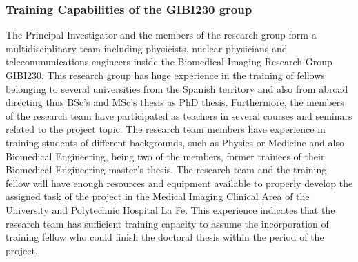 \subsubsection*{Training Capabilities of the GIBI230 group}
The Principal Investigator and the members of the research group form a multidisciplinary team including physicists, nuclear physicians and telecommunications engineers inside the Biomedical Imaging Research Group GIBI230. This research group has huge experience in the training of fellows belonging to several universities from the Spanish territory and also from abroad directing thus BSc’s and MSc’s thesis as PhD thesis. Furthermore, the members of the research team have participated as teachers in several courses and seminars related to the project topic. 
The research team members have experience in training students of different backgrounds, such as Physics or Medicine and also Biomedical Engineering, being two of the members, former trainees of their Biomedical Engineering master’s thesis.
The research team and the training fellow will have enough resources and equipment available to properly develop the assigned task of the project in the Medical Imaging Clinical Area of the University and Polytechnic Hospital La Fe. 
This experience indicates that the research team has sufficient training capacity to assume the incorporation of training fellow who could finish the doctoral thesis within the period of the project. 
